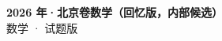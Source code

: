 \documentclass[zihao=-4, a4paper]{ctexart}
\begin{document}
\begin{center}
  {\Large\bfseries 2026 年·北京卷数学（回忆版，内部候选）}\\[4pt]
  {\large 数学 · 试题版}
\end{center}
\medskip
{}

\end{document}
